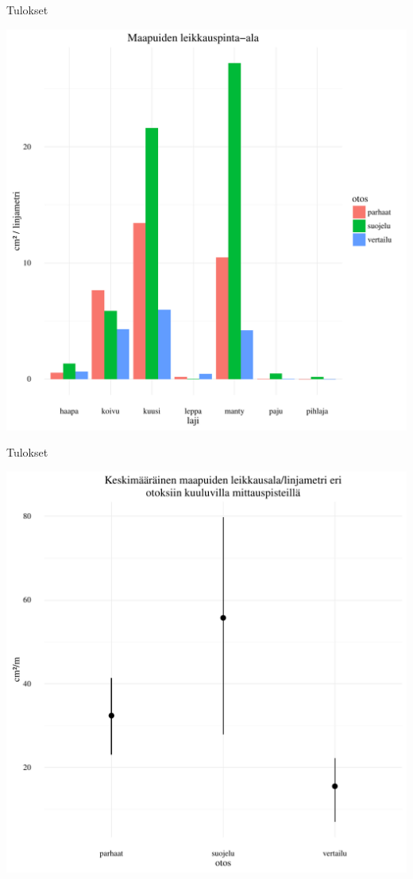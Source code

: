 \documentclass{beamer}
\begin{document}
\begin{frame}{Tulokset}
  \begin{center}
    \includegraphics[height = 0.9\textheight]{maapuut.pdf}
  \end{center}
\end{frame}

\begin{frame}{Tulokset}
  \begin{center}
    \includegraphics[height = 0.9\textheight]{maapuiden_leikkausala_boot.pdf}
  \end{center}
\end{frame}
\end{document}
